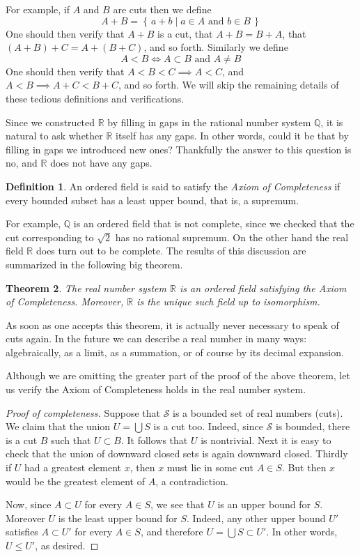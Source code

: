 \documentclass[11pt,oneside]{amsbook}
\newcommand{\set}[1]{\left\{\,#1\,\right\}}
\newcommand{\Q}{\mathbb Q}
\newcommand{\R}{\mathbb R}
\theoremstyle{definition}
\theoremstyle{plain}
\newtheorem{theorem}{Theorem}[section]
\theoremstyle{definition}
\newtheorem{definition}[theorem]{Definition}
\theoremstyle{remark}
\numberwithin{equation}{section}
\numberwithin{figure}{section}
\begin{document}
For example, if $A$ and $B$ are cuts then we define
\[A+B=\set{a+b\mid a\in A\text{ and }b\in B}
\]
One should then verify that $A+B$ is a cut, that $A+B=B+A$, that $(A+B)+C=A+(B+C)$, and so forth. Similarly we define
\[A<B\iff A\subset B\text{ and }A\neq B
\]
One should then verify that $A<B<C\implies A<C$, and $A<B\implies A+C<B+C$, and so forth. We will skip the remaining details of these tedious definitions and verifications.

Since we constructed $\R$ by filling in gaps in the rational number system $\Q$, it is natural to ask whether $\R$ itself has any gaps. In other words, could it be that by filling in gaps we introduced new ones? Thankfully the answer to this question is no, and $\R$ does not have any gaps.

\begin{definition}
  An ordered field is said to satisfy the \emph{Axiom of Completeness} if every bounded subset has a least upper bound, that is, a supremum.
\end{definition}


For example, $\Q$ is an ordered field that is not complete, since we checked that the cut corresponding to $\sqrt2$ has no rational supremum. On the other hand the real field $\R$ does turn out to be complete. The results of this discussion are summarized in the following big theorem.

\begin{theorem}
  The real number system $\R$ is an ordered field satisfying the Axiom of Completeness. Moreover, $\R$ is the unique such field up to isomorphism.
\end{theorem}

As soon as one accepts this theorem, it is actually never necessary to speak of cuts again. In the future we can describe a real number in many ways: algebraically, as a limit, as a summation, or of course by its decimal expansion.

Although we are omitting the greater part of the proof of the above theorem, let us verify the Axiom of Completeness holds in the real number system.

\begin{proof}[Proof of completeness]
  Suppose that $\mathcal S$ is a bounded set of real numbers (cuts). We claim that the union $U=\bigcup S$ is a cut too. Indeed, since $\mathcal S$ is bounded, there is a cut $B$ such that  $U\subset B$. It follows that $U$ is nontrivial. Next it is easy to check that the union of downward closed sets is again downward closed. Thirdly if $U$ had a greatest element $x$, then $x$ must lie in some cut $A\in S$. But then $x$ would be the greatest element of $A$, a contradiction.

  Now, since $A\subset U$ for every $A\in S$, we see that $U$ is an upper bound for $S$. Moreover $U$ is the least upper bound for $S$. Indeed, any other upper bound $U'$ satisfies $A\subset U'$ for every $A\in S$, and therefore $U=\bigcup S\subset U'$. In other words, $U\leq U'$, as desired.
\end{proof}
\end{document}

